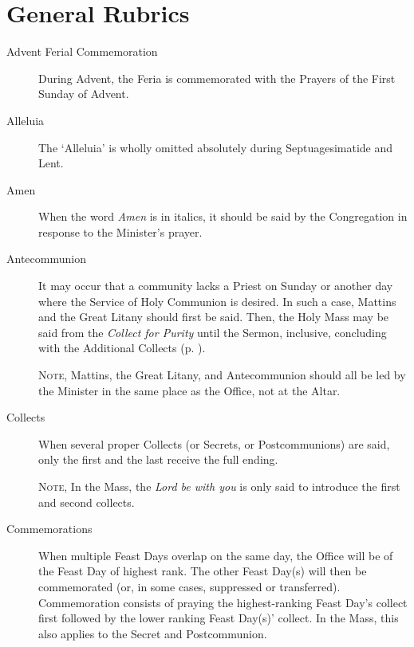 \section{General Rubrics}
\begin{description}
\item[Advent Ferial Commemoration] During Advent, the Feria is commemorated with the Prayers of the First Sunday of Advent.
\item[Alleluia] The `Alleluia' is wholly omitted absolutely during Septuagesimatide and Lent.
\item[Amen] When the word \emph{Amen} is in italics, it should be said by the Congregation in response to the Minister's prayer.
\item[Antecommunion] It may occur that a community lacks a Priest on Sunday or another day where the Service of Holy Communion is desired. In such a case, Mattins and the Great Litany should first be said. Then, the Holy Mass may be said from the \emph{Collect for Purity} until the Sermon, inclusive, concluding with the Additional Collects (p. \pageref{AdditionalCollects}).\par
\textsc{Note,} Mattins, the Great Litany, and Antecommunion should all be led by the Minister in the same place as the Office, not at the Altar.
\item[Collects] When several proper Collects (or Secrets, or Postcommunions) are said, only the first and the last receive the full ending.\par
	\textsc{Note,} In the Mass, the \emph{Lord be with you} is only said to introduce the first and second collects.
\item[Commemorations] When multiple Feast Days overlap on the same day, the Office will be of the Feast Day of highest rank. The other Feast Day(s) will then be commemorated (or, in some cases, suppressed or transferred). Commemoration consists of praying the highest-ranking Feast Day's collect first followed by the lower ranking Feast Day(s)' collect. In the Mass, this also applies to the Secret and Postcommunion.


\end{description}
